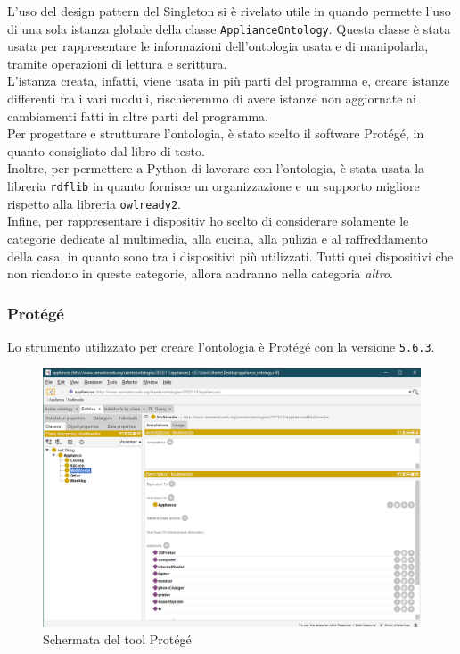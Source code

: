 \documentclass[12pt, letterpaper]{article}
\begin{document}
\noindent L'uso del design pattern del Singleton si è rivelato utile in quando permette l'uso di
una sola istanza globale della classe \texttt{ApplianceOntology}. Questa classe è stata usata per
rappresentare le informazioni dell'ontologia usata e di manipolarla, tramite operazioni di lettura e
scrittura. \\

\noindent L'istanza creata, infatti, viene usata in più parti del programma e, creare istanze differenti
fra i vari moduli, rischieremmo di avere istanze non aggiornate ai cambiamenti fatti in altre parti del
programma. \\

\noindent Per progettare e strutturare l'ontologia, è stato scelto il software Protégé, in quanto
consigliato dal libro di testo. \\

\noindent Inoltre, per permettere a Python di lavorare con l'ontologia, è stata usata la libreria \texttt{rdflib}
in quanto fornisce un organizzazione e un supporto migliore rispetto alla libreria \texttt{owlready2}. \\

\noindent Infine, per rappresentare i dispositiv ho scelto di considerare solamente le categorie dedicate al
multimedia, alla cucina, alla pulizia e al raffreddamento della casa, in quanto sono tra i dispositivi più
utilizzati. Tutti quei dispositivi che non ricadono in queste categorie, allora andranno nella
categoria \textit{altro}.

\subsubsection{Protégé}

Lo strumento utilizzato per creare l'ontologia è Protégé \cite{protege} con la versione
\texttt{5.6.3}.

\begin{figure}[h]
      \centering
      \includegraphics[scale=0.4]{protege-home.png}
      \caption{Schermata del tool Protégé}
\end{figure}
\end{document}
